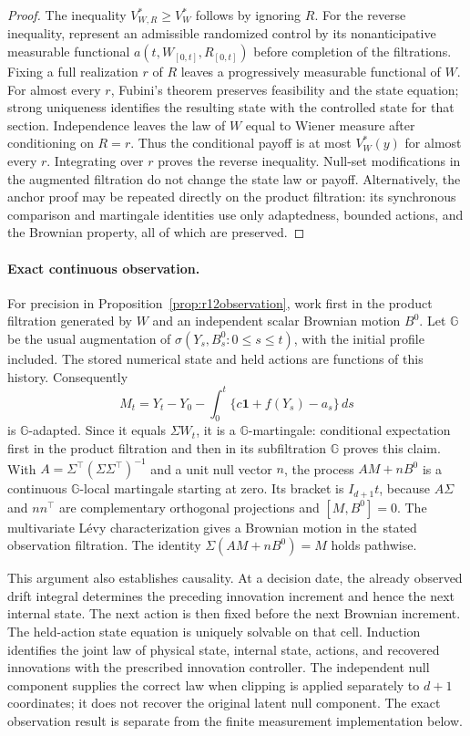 \begin{proof}
The inequality $V_{W,R}^*\geq V_W^*$ follows by ignoring $R$. For the
reverse inequality, represent an admissible randomized control by its
nonanticipative measurable functional $a(t,W_{[0,t]},R_{[0,t]})$ before
completion of the filtrations. Fixing a full realization $r$ of $R$
leaves a progressively measurable functional of $W$. For almost every
$r$, Fubini's theorem preserves feasibility and the state equation;
strong uniqueness identifies the resulting state with the controlled
state for that section. Independence leaves the law of $W$ equal to
Wiener measure after conditioning on $R=r$. Thus the conditional payoff
is at most $V_W^*(y)$ for almost every $r$. Integrating over $r$ proves
the reverse inequality. Null-set modifications in the augmented
filtration do not change the state law or payoff. Alternatively, the
anchor proof may be repeated directly on the product filtration: its
synchronous comparison and martingale identities use only adaptedness,
bounded actions, and the Brownian property, all of which are preserved.
\end{proof}

\paragraph*{Exact continuous observation.}
For precision in Proposition~\ref{prop:r12observation}, work first in
the product filtration generated by $W$ and an independent scalar
Brownian motion $B^0$. Let $\mathbb G$ be the usual augmentation of
$\sigma(Y_s,B_s^0:0\leq s\leq t)$, with the initial profile included.
The stored numerical state and held actions are functions of this
history. Consequently
\[
 M_t=Y_t-Y_0-\int_0^t\{c\bm1+f(Y_s)-a_s\}\,ds
\]
is $\mathbb G$-adapted. Since it equals $\Sigma W_t$, it is a
$\mathbb G$-martingale: conditional expectation first in the product
filtration and then in its subfiltration $\mathbb G$ proves this claim.
With $A=\Sigma^\top(\Sigma\Sigma^\top)^{-1}$ and a unit null vector
$n$, the process $AM+nB^0$ is a continuous $\mathbb G$-local martingale
starting at zero. Its bracket is $I_{d+1}t$, because
$A\Sigma$ and $nn^\top$ are complementary orthogonal projections and
$[M,B^0]=0$. The multivariate L\'evy characterization gives a Brownian
motion in the stated observation filtration. The identity
$\Sigma(AM+nB^0)=M$ holds pathwise.

This argument also establishes causality. At a decision date, the
already observed drift integral determines the preceding innovation
increment and hence the next internal state. The next action is then
fixed before the next Brownian increment. The held-action state equation
is uniquely solvable on that cell. Induction identifies the joint law
of physical state, internal state, actions, and recovered innovations
with the prescribed innovation controller. The independent null
component supplies the correct law when clipping is applied separately
to $d+1$ coordinates; it does not recover the original latent null
component. The exact observation result is separate from the finite
measurement implementation below.



